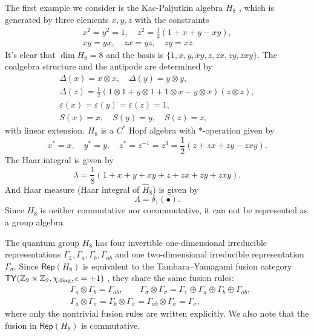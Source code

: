 \documentclass[a4paper,11pt]{article}
\theoremstyle{theorem}
\theoremstyle{remark}
\newcommand{\Zbb}{\mathbb{Z}}
\newcommand{\one}{\mathbb{1}}
\newcommand{\Rep}{\mathsf{Rep}}
\begin{document}
The first example we consider is the Kac-Paljutkin algebra $H_8$ \cite{kac1966finite}, which is generated by three elements $x, y, z$ with the constraints 
\begin{gather*}
        x^2 = y^2 = 1, \quad z^2 = \frac{1}{2}(1+x+y-xy), \\
        xy = yx,\quad zx=yz,\quad zy = xz. 
\end{gather*}
It's clear that $\dim H_8 =8$ and the basis is $\{1,x,y,xy,z,zx,zy,zxy\}$. 
The coalgebra structure and the antipode are determined by 
\begin{gather*}
    \Delta(x) = x\otimes x,\quad \Delta(y) = y\otimes y, \\
    \Delta(z) = \frac{1}{2}(1\otimes 1+y\otimes 1 + 1\otimes x - y\otimes x)(z\otimes z), \\
    \varepsilon(x) = \varepsilon(y) = \varepsilon(z) = 1, \\
    S(x) = x,\quad S(y) = y, \quad S(z) = z,
\end{gather*}
with linear extension. 
$H_8$ is a $C^*$ Hopf algebra with $*$-operation given by
\begin{equation}
    x^*=x,\quad y^*=y,\quad z^*=z^{-1}=z^3=\frac{1}{2}(z+zx + zy -zxy).
\end{equation}
The Haar integral is given by 
\begin{equation}
    \lambda =\frac{1}{8}(1 + x + y + xy + z + zx + zy + zxy).
\end{equation}
And Haar measure (Haar integral of $\hat{H}_8$) is given by
\begin{equation}
    \Lambda =\delta_1(\bullet).
\end{equation}
Since $H_8$ is neither commutative nor cocommutative, it can not be represented as a group algebra.


The quantum group $H_8$ has four invertible one-dimensional irreducible representations $\Gamma_{\one}, \Gamma_{a}, \Gamma_{b}, \Gamma_{ab}$ and one two-dimensional irreducible representation $\Gamma_{\sigma}$.  
Since $\Rep(H_8)$ is equivalent to the Tambara--Yamagami fusion category $\mathsf{TY}(\Zbb_2\times \Zbb_2, \chi_{\rm diag}, \epsilon=+1)$ \cite{tambara1998tensor}, they share the same fusion rules:
\begin{equation}
\begin{aligned}
     &\Gamma_{a}\otimes \Gamma_{b} = \Gamma_{ab}, \qquad 
     \Gamma_{\sigma} \otimes \Gamma_{\sigma} = \Gamma_{\one} \oplus \Gamma_a \oplus \Gamma_b \oplus \Gamma_{ab},\\
     &\Gamma_a \otimes \Gamma_{\sigma} = \Gamma_b \otimes \Gamma_{\sigma} = \Gamma_{ab} \otimes \Gamma_{\sigma} = \Gamma_{\sigma},
\end{aligned}
\end{equation}
where only the nontrivial fusion rules are written explicitly. We also note that the fusion in $\Rep(H_8)$ is commutative.
\end{document}
